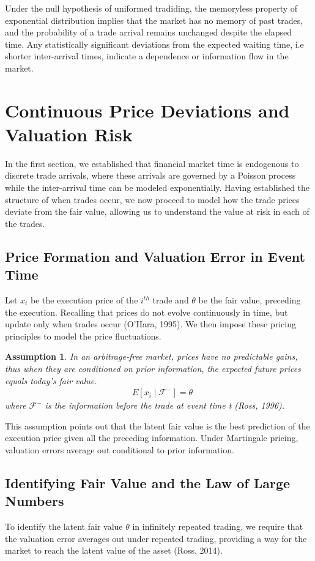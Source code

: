 \documentclass[12pt]{article}
\theoremstyle{plain}
\newtheorem{assumption}[theorem]{Assumption}
\theoremstyle{definition}
\numberwithin{equation}{section}
\begin{document}
Under the null hypothesis of uniformed tradiding, the memoryless property of exponential distribution implies that the market has no memory of past trades, and the probability of a trade arrival remains unchanged despite the elapsed time. Any statistically significant deviations from the expected waiting time, i.e shorter inter-arrival times, indicate a dependence or information flow in the market.

\section{Continuous Price Deviations and Valuation Risk}
In the first section, we established that financial market time is endogenous to discrete trade arrivals, where these arrivals are governed by a Poisson process while the inter-arrival time can be modeled exponentially. Having established the structure of when trades occur, we now proceed to model how the trade prices deviate from the fair value, allowing us to understand the value at risk in each of the trades.

\subsection{Price Formation and Valuation Error in Event Time}
Let $x_i$ be the execution price of  the $i^{th}$ trade and $\theta$ be the fair value, preceding the execution. Recalling that prices do not evolve continuously in time, but update only when trades occur (O'Hara, 1995). We then impose these pricing principles to model the price fluctuations.

\begin{assumption}
In an arbitrage-free market, prices have no predictable gains, thus when they are conditioned on prior information, the expected future prices equals today’s fair value.
\begin{align}
&E[x_i \mid \mathcal{F}^ -]= \theta
\end{align}
where $\mathcal{F^-}$ is the information before the trade at event time t (Ross, 1996).
\end{assumption}

This assumption points out that the latent fair value is the best prediction of the execution price given all the preceding information. Under Martingale pricing, valuation errors average out conditional to prior information.

\subsection{Identifying Fair Value and the Law of Large Numbers}
To identify the latent fair value $\theta$ in infinitely repeated trading, we require that the valuation error averages out under repeated trading, providing a way for the market to reach the latent value of the asset (Ross, 2014).
\end{document}
